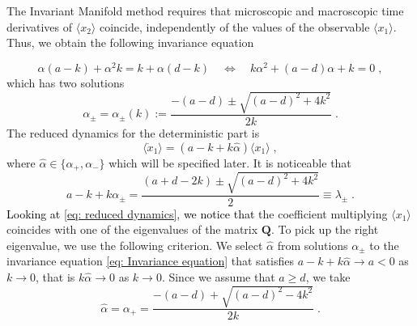 \documentclass[a4paper,twoside]{article}      %
\theoremstyle{definition}
\newcommand{\AM}{\textcolor{black}}
\begin{document}
The Invariant Manifold method requires that microscopic and macroscopic time derivatives of $\langle x_2\rangle$ coincide, independently of the values of the observable $\langle x_1\rangle$. Thus, we obtain the following invariance equation

\begin{equation}
    \label{eq: Invariance equation}
    \alpha (a-k)+\alpha^2 k=k+\alpha (d-k)\quad \Longleftrightarrow \quad k\alpha^2+(a-d)\alpha +k=0 \;,
\end{equation}
which has two solutions
$$
\alpha_{\pm}=\alpha_{\pm}(k):=\frac{-(a-d)\pm \sqrt{(a-d)^2+4k^2}}{2k} \;.
$$
The reduced dynamics for the deterministic part is
\begin{equation}
    \label{eq: reduced dynamics}
    \langle \dot{x}_1\rangle =(a-k+ k \hat{\alpha})\langle x_1\rangle \;,
\end{equation}
where $\hat{\alpha}\in\{\alpha_+, \alpha_-\}$ which will be specified later. It is noticeable that
$$
a-k+k\alpha_{\pm}=\frac{(a+d-2k)\pm\sqrt{(a-d)^2+4k^2}}{2}\equiv \lambda_{\pm} \;.
$$
\AM{Looking at} \eqref{eq: reduced dynamics}, \AM{ we notice that } the coefficient multiplying $\langle x_1 \rangle$  coincides with one of the eigenvalues of the matrix $\mathbf{Q}$. To pick up the right eigenvalue, we use the following criterion.  %
We select $\hat{\alpha}$ from solutions $\alpha_\pm$ to the invariance equation \eqref{eq: Invariance equation} that satisfies $a-k+k \hat{\alpha} \rightarrow a<0$ as $k\rightarrow 0$, that is $k\hat{\alpha} \rightarrow 0$ as $k\rightarrow 0$. Since we assume that $a\geq d$, we take
$$
\hat{\alpha}=\alpha_{+}=\frac{-(a-d)+ \sqrt{(a-d)^2-4k^2}}{2k} \;.
$$
\end{document}
